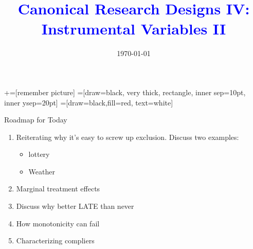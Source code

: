 \documentclass[notes,11pt, aspectratio=169]{beamer}
\title[]{\textcolor{blue}{Canonical Research Designs IV:\\ Instrumental Variables II }}
\author[PGP]{}
\institute[FRBNY]{\small{\begin{tabular}{c}
  Paul Goldsmith-Pinkham  \\
\end{tabular}}}
\date{\today}
\begin{document}
\newcommand\marktopleft[1]{%
    \tikz[overlay,remember picture] 
        \node (marker-#1-a) at (-.3em,.3em) {};%
}
\newcommand\markbottomright[2]{%
    \tikz[overlay,remember picture] 
        \node (marker-#1-b) at (0em,0em) {};%
}
+=[remember picture] 
 =[draw=black, very thick, rectangle, inner sep=10pt, inner ysep=20pt]
 =[draw=black,fill=red, text=white]

\begin{frame}
\maketitle
\end{frame}

\begin{frame}{Roadmap for Today}
    \begin{enumerate}
    \item Reiterating why it's easy to screw up exclusion. Discuss two examples:
      \begin{itemize}
      \item lottery
      \item Weather
      \end{itemize}
    \item Marginal treatment effects
    \item Discuss why better LATE than never      
    \item How monotonicity can fail
    \item Characterizing compliers
    \end{enumerate}

\end{frame}

\end{document}
